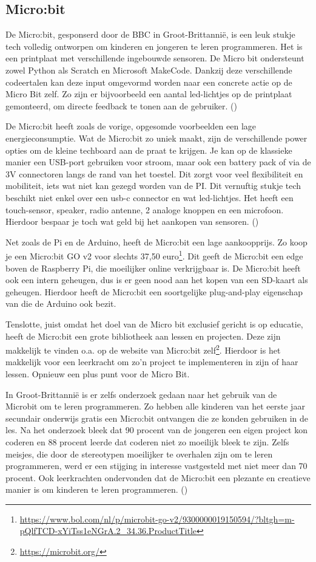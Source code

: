 \subsection{Micro:bit }
De Micro:bit, gesponserd door de BBC in Groot-Brittannië, is een leuk stukje tech volledig ontworpen om kinderen en jongeren te leren programmeren. Het is een printplaat met verschillende ingebouwde sensoren. De Micro bit ondersteunt zowel Python als Scratch en Microsoft MakeCode. Dankzij deze verschillende codeertalen kan deze input omgevormd worden naar een concrete actie op de Micro Bit zelf. Zo zijn er bijvoorbeeld een aantal led-lichtjes op de printplaat gemonteerd, om directe feedback te tonen aan de gebruiker. (\cite{Stager2018})

De Micro:bit heeft zoals de vorige, opgesomde voorbeelden een lage energieconsumptie. Wat de Micro:bit zo uniek maakt, zijn de verschillende power opties om de kleine techboard aan de praat te krijgen. Je kan op de klassieke manier een USB-port gebruiken voor stroom, maar ook een battery pack of via de 3V connectoren langs de rand van het toestel. Dit zorgt voor veel flexibiliteit en mobiliteit, iets wat niet kan gezegd worden van de PI.
Dit vernuftig stukje tech beschikt niet enkel over een usb-c connector en wat led-lichtjes. Het heeft een touch-sensor, speaker, radio antenne, 2 analoge knoppen en een microfoon. Hierdoor bespaar je toch wat geld bij het aankopen van sensoren. (\cite{Stager2018})

Net zoals de Pi en de Arduino, heeft de Micro:bit een lage aankoopprijs. Zo koop je een Micro:bit GO v2 voor slechts 37,50 euro\footnote{\url{https://www.bol.com/nl/p/microbit-go-v2/9300000019150594/?bltgh=m-pQlfTCD-xYiTss1eNGrA.2_34.36.ProductTitle}}. Dit geeft de Micro:bit een edge boven de Raspberry Pi, die moeilijker online verkrijgbaar is. De Micro:bit heeft ook een intern geheugen, dus is er geen nood aan het kopen van een SD-kaart als geheugen. Hierdoor heeft de Micro:bit een soortgelijke plug-and-play eigenschap van die de Arduino ook bezit.

Tenslotte, juist omdat het doel van de Micro bit exclusief gericht is op educatie, heeft de Micro:bit een grote bibliotheek aan lessen en projecten. Deze zijn makkelijk te vinden o.a. op de  website van Micro:bit zelf\footnote{\url{https://microbit.org/}}. Hierdoor is het makkelijk voor een leerkracht om zo’n project te implementeren in zijn of haar lessen. Opnieuw een plus punt voor de Micro Bit.

In Groot-Brittannië is er zelfs onderzoek gedaan naar het gebruik van de Microbit om te leren programmeren. Zo hebben alle kinderen van het eerste jaar secundair onderwijs gratis een Micro:bit ontvangen die ze konden gebruiken in de les. Na het onderzoek bleek dat 90 procent van de jongeren een eigen project kon coderen en 88 procent leerde dat coderen niet zo moeilijk bleek te zijn. Zelfs meisjes, die door de stereotypen moeilijker te overhalen zijn om te leren programmeren, werd er een stijging in interesse vastgesteld met niet meer dan 70 procent. Ook leerkrachten ondervonden dat de Micro:bit een plezante en creatieve manier is om kinderen te leren programmeren. (\cite{IW2017})


